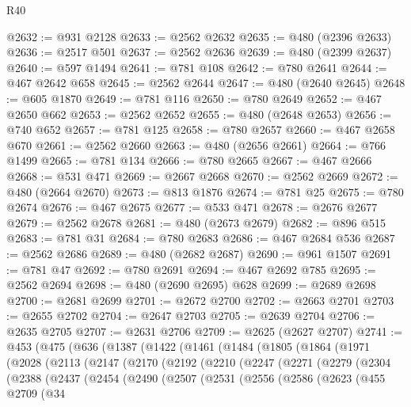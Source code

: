 \begin{lexlean}{R40}
\begin{coremodule}
@2632 := @931 @2128
@2633 := @2562 @2632
@2635 := @480 (@2396 @2633)
@2636 := @2517 @501
@2637 := @2562 @2636
@2639 := @480 (@2399 @2637)
@2640 := @597 @1494
@2641 := @781 @108
@2642 := @780 @2641
@2644 := @467 @2642 @658
@2645 := @2562 @2644
@2647 := @480 (@2640 @2645)
@2648 := @605 @1870
@2649 := @781 @116
@2650 := @780 @2649
@2652 := @467 @2650 @662
@2653 := @2562 @2652
@2655 := @480 (@2648 @2653)
@2656 := @740 @652
@2657 := @781 @125
@2658 := @780 @2657
@2660 := @467 @2658 @670
@2661 := @2562 @2660
@2663 := @480 (@2656 @2661)
@2664 := @766 @1499
@2665 := @781 @134
@2666 := @780 @2665
@2667 := @467 @2666
@2668 := @531 @471
@2669 := @2667 @2668
@2670 := @2562 @2669
@2672 := @480 (@2664 @2670)
@2673 := @813 @1876
@2674 := @781 @25
@2675 := @780 @2674
@2676 := @467 @2675
@2677 := @533 @471
@2678 := @2676 @2677
@2679 := @2562 @2678
@2681 := @480 (@2673 @2679)
@2682 := @896 @515
@2683 := @781 @31
@2684 := @780 @2683
@2686 := @467 @2684 @536
@2687 := @2562 @2686
@2689 := @480 (@2682 @2687)
@2690 := @961 @1507
@2691 := @781 @47
@2692 := @780 @2691
@2694 := @467 @2692 @785
@2695 := @2562 @2694
@2698 := @480 (@2690 @2695) @628
@2699 := @2689 @2698
@2700 := @2681 @2699
@2701 := @2672 @2700
@2702 := @2663 @2701
@2703 := @2655 @2702
@2704 := @2647 @2703
@2705 := @2639 @2704
@2706 := @2635 @2705
@2707 := @2631 @2706
@2709 := @2625 (@2627 @2707)
@2741 := @453
    (@475
      (@636
        (@1387
          (@1422
            (@1461
              (@1484
                (@1805
                  (@1864
                    (@1971
                      (@2028
                        (@2113
                          (@2147
                            (@2170
                              (@2192
                                (@2210
                                  (@2247
                                    (@2271
                                      (@2279
                                        (@2304
                                          (@2388
                                            (@2437
                                              (@2454
                                                (@2490
                                                  (@2507
                                                    (@2531
                                                      (@2556
                                                        (@2586
                                                          (@2623
                                                            (@455
                                                              @2709
                                                              (@34

\end{coremodule}
\end{lexlean}
